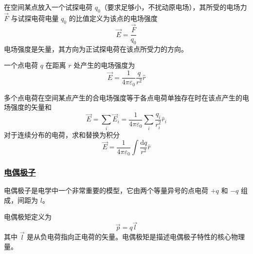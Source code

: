 \begin{definition}[电场强度]
    在空间某点放入一个试探电荷 $q_0$（要求足够小，不扰动原电场），其所受的电场力 $\vec{F}$ 与试探电荷电量 $q_0$ 的比值定义为该点的电场强度
    \begin{equation}
        \vec{E} = \frac{\vec{F}}{q_0}
    \end{equation}
    电场强度是矢量，其方向为正试探电荷在该点所受力的方向。
\end{definition}

一个点电荷 $q$ 在距离 $r$ 处产生的电场强度为
\begin{equation}
    \vec{E} = \frac{1}{4\pi\varepsilon_0}\frac{q}{r^2}\hat{r}
\end{equation}

\begin{theorem}[场强叠加原理]
    多个点电荷在空间某点产生的合电场强度等于各点电荷单独存在时在该点产生的电场强度的矢量和
    \begin{equation}
        \vec{E} = \sum_i \vec{E}_i = \frac{1}{4\pi\varepsilon_0}\sum_i \frac{q_i}{r_i^2}\hat{r}_i
    \end{equation}
    对于连续分布的电荷，求和替换为积分
    \begin{equation}
        \vec{E} = \frac{1}{4\pi\varepsilon_0}\int \frac{\mathrm{d}q}{r^2}\hat{r}
    \end{equation}
\end{theorem}

\subsubsection{\protect\hyperlink{:}{电偶极子}}

电偶极子是电学中一个非常重要的模型，它由两个等量异号的点电荷 $+q$ 和 $-q$ 组成，间距为 $l$。

\begin{definition}[电偶极子与电偶极矩]
    电偶极矩定义为
    \begin{equation}
        \vec{p} = q\vec{l}
    \end{equation}
    其中 $\vec{l}$ 是从负电荷指向正电荷的矢量。电偶极矩是描述电偶极子特性的核心物理量。
\end{definition}

